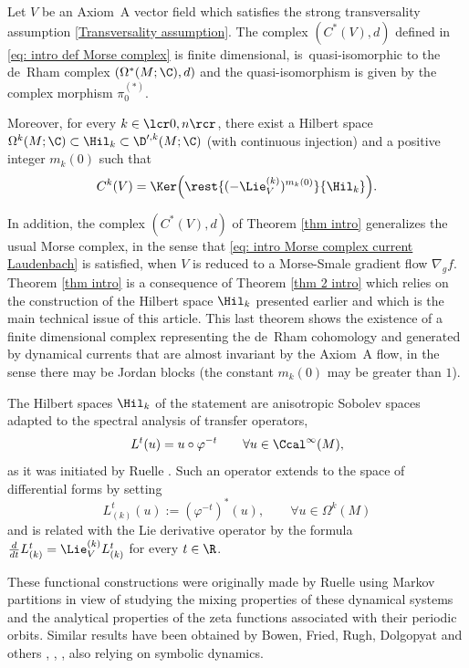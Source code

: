 \begin{thm}\label{thm intro}
Let $V$ be an Axiom~A vector field which satisfies the strong transversality assumption \eqref{Transversality assumption}. The complex $(C^* (V),d)$ defined in \eqref{eq: intro def Morse complex} is finite dimensional, is~quasi-isomorphic to the de~Rham complex $(\Omega^* (M;\C),d)$ and the quasi-isomorphism is given by the complex morphism $\pi_0^{(*)}$.

Moreover, for every $k\in\lcr0,n\rcr$, there exist a Hilbert space $\Omega^k (M;\C) \subset \Hil_k \subset \D^{\prime,k} (M;\C)$ (with continuous injection) and a positive integer $m_k (0)$ such that
\[
C^k (V) = \Ker \Bigl(\rest{(-\Lie_V^{(k)})^{m_{k} (0)}}{\Hil_{k}} \Bigr).
\]
\end{thm}

In addition, the complex $(C^* (V), d)$ of Theorem \ref{thm intro} generalizes the usual Morse complex, in the sense that \eqref{eq: intro Morse complex current Laudenbach} is satisfied, when $V$ is reduced to a Morse-Smale gradient flow $\nabla_g f$. Theorem \ref{thm intro} is a consequence of Theorem \ref{thm 2 intro} which relies on the construction of the Hilbert space $\Hil_k$ presented earlier and which is the main technical issue of this article. This last theorem shows the existence of a finite dimensional complex representing the de~Rham cohomology and generated by dynamical currents that are almost invariant by the Axiom~A flow, in the sense there may be Jordan blocks (the constant $m_k (0)$ may be greater than $1$).

The Hilbert spaces $\Hil_k$ of the statement are anisotropic Sobolev spaces adapted to the spectral analysis of transfer operators,
\[
L^t (u) = u \circ \varphi^{-t} \qquad \forall u \in \Ccal^{\infty} (M),
\]
as it was initiated by Ruelle \cite{ruelle, ruelle_book}. Such an operator extends to the space of differential forms by setting
\[
L_{(k)}^t (u):= (\varphi^{-t})^* (u), \qquad \forall u \in \Omega^k (M)
\]
and is related with the Lie derivative operator by the formula $\frac{d}{dt} L_{(k)}^t = \Lie_V^{(k)} L_{(k)}^t$ for every $t \in \R$.


These functional constructions were originally made by Ruelle using Markov partitions in view of studying the mixing properties of these dynamical systems and the analytical properties of the zeta functions associated with their periodic orbits. Similar results have been obtained by Bowen, Fried, Rugh, Dolgopyat and others \cite{bowen2}, \cite{fried_meromorphic}, \cite{rugh}, \cite{dolgopyat} also relying on symbolic dynamics.

